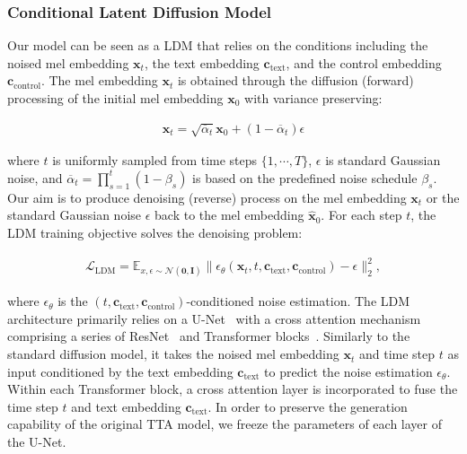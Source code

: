 \documentclass[letterpaper]{article} %
\begin{document}
\subsubsection{Conditional Latent Diffusion Model} Our model can be seen as a LDM that relies on the conditions including the noised mel embedding $\mathbf{x}_{t}$, the text embedding $\mathbf{c}_{\text{text}}$, and the control embedding $\mathbf{c}_{\text{control}}$. The mel embedding $\mathbf{x}_{t}$ is obtained through the diffusion (forward) processing of the initial mel embedding $\mathbf{x}_{0}$ with variance preserving:

\begin{align}
\mathbf{x}_{t} = \sqrt{\overline\alpha_{t}} \mathbf{x}_{0} + (1-\overline\alpha_{t})\epsilon
\end{align}

where $t$ is uniformly sampled from time steps $\{1, \cdots, T\}$, $\epsilon$ is standard Gaussian noise, and $\overline\alpha_{t} = \prod_{s=1}^{t}(1 - \beta_{s})$ is based on the predefined noise schedule $\beta_{s}$. Our aim is to produce denoising (reverse) process on the mel embedding $\mathbf{x}_{t}$ or the standard Gaussian noise $\epsilon$ back to the mel embedding $\mathbf{\hat{x}}_0$. For each step $t$, the LDM training objective solves the denoising problem:

\begin{align}
\mathcal{L}_{\text{LDM}} = \mathbb{E}_{x, \epsilon \sim  \mathcal{N}(\mathbf{0}, \mathbf{I})}
\| \epsilon_{\theta}(\mathbf{x}_{t}, t, \mathbf{c}_{\text{text}}, \mathbf{c}_{\text{control}}) -   \epsilon \|^2_2,
\end{align}

where $\epsilon_{\theta}$ is the $(t, \mathbf{c}_{\text{text}}, \mathbf{c}_{\text{control}})$-conditioned noise estimation. The LDM architecture primarily relies on a U-Net~\cite{yang2022diffsound} with a cross attention mechanism~\cite{vaswani2017attention} comprising a series of ResNet~\cite{he2016resnet} and Transformer blocks~\cite{vaswani2017attention}. Similarly to the standard diffusion model, it takes the noised mel embedding $\mathbf{x}_{t}$ and time step $t$ as input conditioned by the text embedding $\mathbf{c}_{\text{text}}$ to predict the noise estimation $\epsilon_{\theta}$. Within each Transformer block, a cross attention layer is incorporated to fuse the time step $t$ and text embedding $\mathbf{c}_{\text{text}}$. In order to preserve the generation capability of the original TTA model, we freeze the parameters of each layer of the U-Net.
\end{document}
